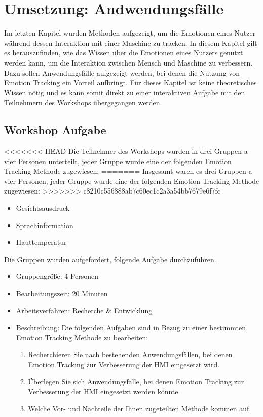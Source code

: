 \section{Umsetzung: Andwendungsfälle}\label{Umsetzung_Anwendungsfaelle}
Im letzten Kapitel wurden Methoden aufgezeigt, um die Emotionen eines Nutzer während dessen Interaktion mit einer Maschine zu tracken. In diesem Kapitel gilt es herauszufinden, wie das Wissen über die Emotionen eines Nutzers genutzt werden kann, um die Interaktion zwischen Mensch und Maschine zu verbessern. Dazu sollen Anwendungsfälle aufgezeigt werden, bei denen die Nutzung von Emotion Tracking ein Vorteil aufbringt. Für dieses Kapitel ist keine theoretisches Wissen nötig und es kann somit direkt zu einer interaktiven Aufgabe mit den Teilnehmern des Workshops übergegangen werden.

\subsection{Workshop Aufgabe}
<<<<<<< HEAD
Die Teilnehmer des Workshops wurden in drei Gruppen a vier Personen unterteilt, jeder Gruppe wurde eine der folgenden Emotion Tracking Methode zugewiesen:
=======
Insgesamt waren es drei Gruppen a vier Personen, jeder Gruppe wurde eine der folgenden Emotion Tracking Methode zugewiesen:
>>>>>>> c8210c556888ab7c60ec1c2a3a54bb7679e6f7fc

\begin{itemize}
	\item Gesichtsausdruck
	\item Sprachinformation
	\item Hauttemperatur
\end{itemize}
Die Gruppen wurden aufgefordert, folgende Aufgabe durchzuführen.
\begin{itemize}
	\item Gruppengröße: 4 Personen
	\item Bearbeitungszeit: 20 Minuten
	\item Arbeitsverfahren: Recherche & Entwicklung
	\item Beschreibung: Die folgenden Aufgaben sind in Bezug zu einer bestimmten Emotion Tracking Methode zu bearbeiten:
	\begin{enumerate}
		\item Recherchieren Sie nach bestehenden Anwendungsfällen, bei denen Emotion Tracking zur Verbesserung der HMI eingesetzt wird.
		\item Überlegen Sie sich Anwendungsfälle, bei denen Emotion Tracking zur Verbesserung der HMI eingesetzt werden könnte.
		\item Welche Vor- und Nachteile der Ihnen zugeteilten Methode kommen auf.
	\end{enumerate}
\end{itemize}

